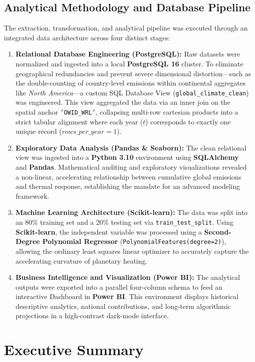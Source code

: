 \documentclass[11pt,letterpaper]{article}
\begin{document}
\subsection{Analytical Methodology and Database Pipeline}
The extraction, transformation, and analytical pipeline was executed through an integrated data architecture across four distinct stages:
\begin{enumerate}
	\item \textbf{Relational Database Engineering (PostgreSQL):} Raw datasets were normalized and ingested into a local \textbf{PostgreSQL 16} cluster. To eliminate geographical redundancies and prevent severe dimensional distortion—such as the double-counting of country-level emissions within continental aggregates like \textit{North America}—a custom SQL Database View (\texttt{global\_climate\_clean}) was engineered. This view aggregated the data via an inner join on the spatial anchor \texttt{'OWID\_WRL'}, collapsing multi-row cartesian products into a strict tabular alignment where each year ($t$) corresponds to exactly one unique record ($rows\_per\_year = 1$).
	\item \textbf{Exploratory Data Analysis (Pandas \& Seaborn):} The clean relational view was ingested into a \textbf{Python 3.10} environment using \textbf{SQLAlchemy} and \textbf{Pandas}. Mathematical auditing and exploratory visualizations revealed a non-linear, accelerating relationship between cumulative global emissions and thermal response, establishing the mandate for an advanced modeling framework.
	\item \textbf{Machine Learning Architecture (Scikit-learn):} The data was split into an 80\% training set and a 20\% testing set via \texttt{train\_test\_split}. Using \textbf{Scikit-learn}, the independent variable was processed using a \textbf{Second-Degree Polynomial Regressor} (\texttt{PolynomialFeatures(degree=2)}), allowing the ordinary least squares linear optimizer to accurately capture the accelerating curvature of planetary heating.
	\item \textbf{Business Intelligence and Visualization (Power BI):} The analytical outputs were exported into a parallel four-column schema to feed an interactive Dashboard in \textbf{Power BI}. This environment displays historical descriptive analytics, national contributions, and long-term algorithmic projections in a high-contrast dark-mode interface.
\end{enumerate}

\section{Executive Summary}
\label{sec:executive_summary}
\end{document}
